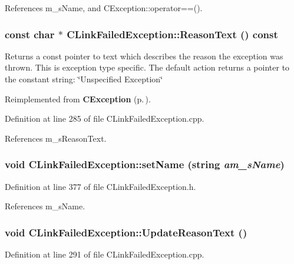 References m\_\-s\-Name, and CException::operator==().
\subsubsection{\setlength{\rightskip}{0pt plus 5cm}const char $\ast$ CLink\-Failed\-Exception::Reason\-Text () const\hspace{0.3cm}{\tt  [virtual]}}\label{classCLinkFailedException_a12}


Returns a const pointer to text which describes the reason the exception was thrown. This is exception type specific. The default action returns a pointer to the constant string: \char`\"{}Unspecified Exception\char`\"{} 

Reimplemented from {\bf CException} {\rm (p.\,\pageref{classCException_a8})}.

Definition at line 285 of file CLink\-Failed\-Exception.cpp.

References m\_\-s\-Reason\-Text.
\subsubsection{\setlength{\rightskip}{0pt plus 5cm}void CLink\-Failed\-Exception::set\-Name (string {\em am\_\-s\-Name})\hspace{0.3cm}{\tt  [inline]}}\label{classCLinkFailedException_a11}




Definition at line 377 of file CLink\-Failed\-Exception.h.

References m\_\-s\-Name.
\subsubsection{\setlength{\rightskip}{0pt plus 5cm}void CLink\-Failed\-Exception::Update\-Reason\-Text ()\hspace{0.3cm}{\tt  [protected]}}\label{classCLinkFailedException_b0}




Definition at line 291 of file CLink\-Failed\-Exception.cpp.

